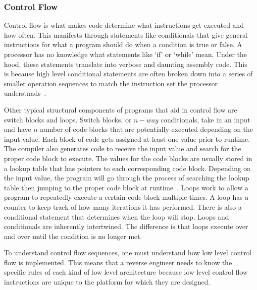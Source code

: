 \subsubsection{Control Flow}
Control flow is what makes code determine what instructions get executed and how often.
This manifests through statements like conditionals that give general instructions for what a program should do when a condition is true or false.
A processor has no knowledge what statements like ‘if’ or ‘while’ mean. 
Under the hood, these statements translate into verbose and daunting assembly code. 
This is because high level conditional statements are often broken down into a series of smaller operation sequences to match the instruction set the processor understnads~\cite{Reversing}.

Other typical structural components of programs that aid in control flow are switch blocks and loops. 
Switch blocks, or \(n-way\) conditionals, take in an input and have \(n\) number of code blocks that are potentially executed depending on the input value. 
Each block of code gets assigned at least one value prior to runtime. 
The compiler also generates code to receive the input value and search for the proper code block to execute. 
The values for the code blocks are usually stored in a lookup table that has pointers to each corresponding code block.  
Depending on the input value, the program will go through the process of searching the lookup table then jumping to the proper code block at runtime~\cite{Reversing}. 
Loops work to allow a program to repeatedly execute a certain code block multiple times. A loop has a counter to keep track of how many iterations it has performed. 
There is also a conditional statement that determines when the loop will stop. 
Loops and conditionals are inherently intertwined. 
The difference is that loops execute over and over until the condition is no longer met.

To understand control flow sequences, one must understand how low level control flow is implemented. 
This means that a reverse engineer needs to know the specific rules of each kind of low level architecture because low level control flow instructions are unique to the platform for which they are designed.

